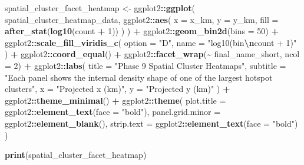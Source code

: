 \documentclass[
]{article}
\newenvironment{Shaded}{\begin{snugshade}}{\end{snugshade}}
\newcommand{\AttributeTok}[1]{\textcolor[rgb]{0.13,0.29,0.53}{#1}}
\newcommand{\DecValTok}[1]{\textcolor[rgb]{0.00,0.00,0.81}{#1}}
\newcommand{\FunctionTok}[1]{\textcolor[rgb]{0.13,0.29,0.53}{\textbf{#1}}}
\newcommand{\NormalTok}[1]{#1}
\newcommand{\OtherTok}[1]{\textcolor[rgb]{0.56,0.35,0.01}{#1}}
\newcommand{\SpecialCharTok}[1]{\textcolor[rgb]{0.81,0.36,0.00}{\textbf{#1}}}
\newcommand{\StringTok}[1]{\textcolor[rgb]{0.31,0.60,0.02}{#1}}
\begin{document}
\begin{Shaded}
\begin{Highlighting}[]
\NormalTok{spatial\_cluster\_facet\_heatmap }\OtherTok{\textless{}{-}}\NormalTok{ ggplot2}\SpecialCharTok{::}\FunctionTok{ggplot}\NormalTok{(}
\NormalTok{  spatial\_cluster\_heatmap\_data,}
\NormalTok{  ggplot2}\SpecialCharTok{::}\FunctionTok{aes}\NormalTok{(}
    \AttributeTok{x =}\NormalTok{ x\_km,}
    \AttributeTok{y =}\NormalTok{ y\_km,}
    \AttributeTok{fill =} \FunctionTok{after\_stat}\NormalTok{(}\FunctionTok{log10}\NormalTok{(count }\SpecialCharTok{+} \DecValTok{1}\NormalTok{))}
\NormalTok{  )}
\NormalTok{) }\SpecialCharTok{+}
\NormalTok{  ggplot2}\SpecialCharTok{::}\FunctionTok{geom\_bin2d}\NormalTok{(}\AttributeTok{bins =} \DecValTok{50}\NormalTok{) }\SpecialCharTok{+}
\NormalTok{  ggplot2}\SpecialCharTok{::}\FunctionTok{scale\_fill\_viridis\_c}\NormalTok{(}
    \AttributeTok{option =} \StringTok{"D"}\NormalTok{,}
    \AttributeTok{name =} \StringTok{"log10(bin}\SpecialCharTok{\textbackslash{}n}\StringTok{count + 1)"}
\NormalTok{  ) }\SpecialCharTok{+}
\NormalTok{  ggplot2}\SpecialCharTok{::}\FunctionTok{coord\_equal}\NormalTok{() }\SpecialCharTok{+}
\NormalTok{  ggplot2}\SpecialCharTok{::}\FunctionTok{facet\_wrap}\NormalTok{(}\SpecialCharTok{\textasciitilde{}}\NormalTok{ final\_name\_short, }\AttributeTok{ncol =} \DecValTok{2}\NormalTok{) }\SpecialCharTok{+}
\NormalTok{  ggplot2}\SpecialCharTok{::}\FunctionTok{labs}\NormalTok{(}
    \AttributeTok{title =} \StringTok{"Phase 9 Spatial Cluster Heatmaps"}\NormalTok{,}
    \AttributeTok{subtitle =} \StringTok{"Each panel shows the internal density shape of one of the largest hotspot clusters"}\NormalTok{,}
    \AttributeTok{x =} \StringTok{"Projected x (km)"}\NormalTok{,}
    \AttributeTok{y =} \StringTok{"Projected y (km)"}
\NormalTok{  ) }\SpecialCharTok{+}
\NormalTok{  ggplot2}\SpecialCharTok{::}\FunctionTok{theme\_minimal}\NormalTok{() }\SpecialCharTok{+}
\NormalTok{  ggplot2}\SpecialCharTok{::}\FunctionTok{theme}\NormalTok{(}
    \AttributeTok{plot.title =}\NormalTok{ ggplot2}\SpecialCharTok{::}\FunctionTok{element\_text}\NormalTok{(}\AttributeTok{face =} \StringTok{"bold"}\NormalTok{),}
    \AttributeTok{panel.grid.minor =}\NormalTok{ ggplot2}\SpecialCharTok{::}\FunctionTok{element\_blank}\NormalTok{(),}
    \AttributeTok{strip.text =}\NormalTok{ ggplot2}\SpecialCharTok{::}\FunctionTok{element\_text}\NormalTok{(}\AttributeTok{face =} \StringTok{"bold"}\NormalTok{)}
\NormalTok{  )}

\FunctionTok{print}\NormalTok{(spatial\_cluster\_facet\_heatmap)}
\end{Highlighting}
\end{Shaded}
\end{document}
